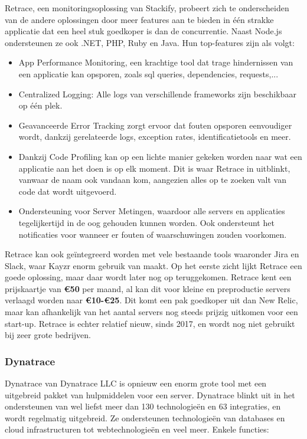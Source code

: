 Retrace, een monitoringsoplossing van Stackify, probeert zich te onderscheiden van de andere oplossingen door meer features aan te bieden in één strakke applicatie dat een heel stuk goedkoper is dan de concurrentie. Naast Node.js ondersteunen ze ook .NET, PHP, Ruby en Java. Hun top-features zijn als volgt:

\begin{itemize}
	\item App Performance Monitoring, een krachtige tool dat trage hindernissen van een applicatie kan opsporen, zoals sql queries, dependencies, requests,...
	\item Centralized Logging: Alle logs van verschillende frameworks zijn beschikbaar op één plek.
	\item Geavanceerde Error Tracking zorgt ervoor dat fouten opsporen eenvoudiger wordt, dankzij gerelateerde logs, exception rates, identificatietools en meer.
	\item Dankzij Code Profiling kan op een lichte manier gekeken worden naar wat een applicatie aan het doen is op elk moment. Dit is waar Retrace in uitblinkt, vanwaar de naam ook vandaan kom, aangezien alles op te zoeken valt van code dat wordt uitgevoerd.
	\item Ondersteuning voor Server Metingen, waardoor alle servers en applicaties tegelijkertijd in de oog gehouden kunnen worden. Ook ondersteunt het notificaties voor wanneer er fouten of waarschuwingen zouden voorkomen.
\end{itemize}

Retrace kan ook geïntegreerd worden met vele bestaande tools waaronder Jira en Slack, waar Kayzr enorm gebruik van maakt. Op het eerste zicht lijkt Retrace een goede oplossing, maar daar wordt later nog op teruggekomen. Retrace kent een prijskaartje van \textbf{\euro50} per maand, al kan dit voor kleine en preproductie servers verlaagd worden naar \textbf{\euro10-\euro25}. Dit komt een pak goedkoper uit dan New Relic, maar kan afhankelijk van het aantal servers nog steeds prijzig uitkomen voor een start-up. Retrace is echter relatief nieuw, sinds 2017, en wordt nog niet gebruikt bij zeer grote bedrijven.

\subsubsection{Dynatrace}
\label{sec:dynatrace}

Dynatrace van Dynatrace LLC is opnieuw een enorm grote tool met een uitgebreid pakket van hulpmiddelen voor een server. Dynatrace blinkt uit in het ondersteunen van wel liefst meer dan 130 technologieën en 63 integraties, en wordt regelmatig uitgebreid. Ze ondersteunen technologieën van databases en cloud infrastructuren tot webtechnologieën en veel meer. Enkele functies:

